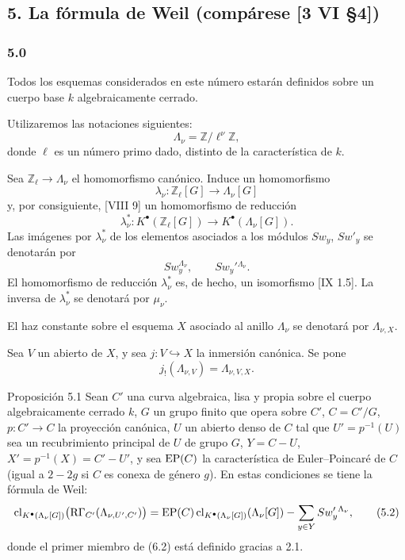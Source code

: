 \subsection*{5. La fórmula de Weil (compárese [3 VI §4])}

\subsubsection*{5.0}

Todos los esquemas considerados en este número estarán definidos sobre un cuerpo base $k$ algebraicamente cerrado.

Utilizaremos las notaciones siguientes:
\[
\Lambda_\nu=\mathbb Z/\ell^\nu\mathbb Z,
\]
donde $\ell$ es un número primo dado, distinto de la característica de $k$.

Sea $\mathbb Z_\ell\to\Lambda_\nu$ el homomorfismo canónico. Induce un homomorfismo
\[
\lambda_\nu:\mathbb Z_\ell[G]\longrightarrow \Lambda_\nu[G]
\]
y, por consiguiente, [VIII 9] un homomorfismo de reducción
\[
\lambda_\nu^*:K^{\bullet}(\mathbb Z_\ell[G])\longrightarrow K^{\bullet}(\Lambda_\nu[G]).
\]
Las imágenes por $\lambda_\nu^*$ de los elementos asociados a los módulos $Sw_y$, $Sw'_y$ se denotarán por
\[
Sw_y^{\Lambda_\nu},\qquad Sw_y'{}^{\Lambda_\nu}.
\]
El homomorfismo de reducción $\lambda_\nu^*$ es, de hecho, un isomorfismo [IX 1.5]. La inversa de $\lambda_\nu^*$ se denotará por $\mu_\nu$.

El haz constante sobre el esquema $X$ asociado al anillo $\Lambda_\nu$ se denotará por $\Lambda_{\nu,X}$.

Sea $V$ un abierto de $X$, y sea $j:V\hookrightarrow X$ la inmersión canónica. Se pone
\[
j_!(\Lambda_{\nu,V})=\Lambda_{\nu,V,X}.
\]

\begin{statement}{Proposición 5.1}
Sean $C'$ una curva algebraica, lisa y propia sobre el cuerpo algebraicamente cerrado $k$, $G$ un grupo finito que opera sobre $C'$, $C=C'/G$, $p:C'\to C$ la proyección canónica, $U$ un abierto denso de $C$ tal que $U'=p^{-1}(U)$ sea un recubrimiento principal de $U$ de grupo $G$, $Y=C-U$, $X'=p^{-1}(X)=C'-U'$, y sea $\operatorname{EP}(C)$ la característica de Euler--Poincaré de $C$ (igual a $2-2g$ si $C$ es conexa de género $g$).
En estas condiciones se tiene la fórmula de Weil:
\[
\operatorname{cl}_{K^{\bullet}(\Lambda_\nu[G])}\bigl(\mathrm{R}\Gamma_{C'}(\Lambda_{\nu,U',C'})\bigr)
=
\operatorname{EP}(C)\operatorname{cl}_{K^{\bullet}(\Lambda_\nu[G])}(\Lambda_\nu[G])
-\sum_{y\in Y}Sw_y'{}^{\Lambda_\nu},
\tag{5.2}
\]
donde el primer miembro de (6.2) está definido gracias a 2.1.
\end{statement}
